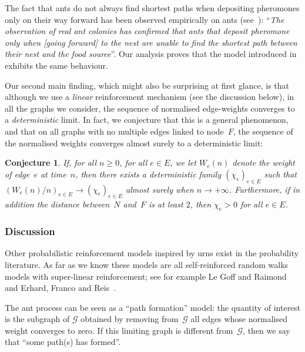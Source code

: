 \documentclass[10pt]{amsart}
\let\mathcal\mathscr
\numberwithin{equation}{section}
\newtheorem{conjecture}[theorem]{Conjecture}
\theoremstyle{definition}
\begin{document}
The fact that ants do not always find shortest paths when depositing pheromones only on their way
forward has been observed empirically on ants (see~\cite[\S 1.1.2]{book_ant}):
``\emph{The observation of real ant colonies has confirmed that ants that deposit pheromone only
when [going forward] to the nest are unable to find the shortest path between their nest and
the food source}''.
Our analysis proves that the model introduced in~\cite{KMS} exhibits the same behaviour.\enlargethispage{.5\baselineskip}%

Our second main finding, which might also be surprising at first glance, is that although we use a \emph{linear} reinforcement mechanism (see the discussion below), in all the graphs we consider, the sequence of normalised edge-weights converges to a \emph{deterministic} limit.
In fact, we conjecture that this is a general phenomenon, and that on all graphs with no multiple edges linked to node~$F$, the sequence of the normalised weights converges almost surely to a deterministic limit:
\begin{conjecture}\label{conj}
If, for all $n\geq 0$, for all $e\in E$, we let $W_e(n)$ denote the weight of edge~$e$ at time~$n$,
then there exists a deterministic family $(\chi_e)_{e\in E}$
such that $(W_e(n)/n)_{e\in E}\to (\chi_e)_{e\in E}$ almost surely when $n\to+\infty$.
Furthermore, if in addition the distance between~$N$ and~$F$ is at least $2$, then $\chi_e>0$ for all $e\in E$.
\end{conjecture}

\subsubsection*{Discussion}
Other {probabilistic reinforcement} models inspired by urns exist in the probability literature.
As far as we know these models are all self-reinforced random walks models with super-linear reinforcement;
see for example Le Goff and Raimond~\cite{LGR} and Erhard, Franco and Reis~\cite{EFR}.

The ant process can be seen as a ``path formation'' model:
the quantity of interest is the subgraph of $\mathcal G$
obtained by removing from~$\mathcal G$ all edges whose normalised weight converges to zero.
If this limiting graph is different from~$\mathcal G$, then we say that ``some path(s) has formed''.
\end{document}
